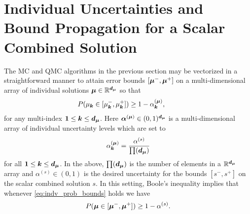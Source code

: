 \documentclass{article}[12pt]
\DeclareMathOperator{\Order}{{\mathcal O}}
\begin{document}

\section{Individual Uncertainties and Bound Propagation for a Scalar Combined Solution} \label{sec:comb_sol_approx}

The MC and QMC algorithms in the previous section may be vectorized in a straightforward manner to attain error bounds $[\boldsymbol{\mu}^-,\boldsymbol{\mu}^+]$ on a multi-dimensional array of individual solutions $\boldsymbol{\mu} \in \mathbb{R}^{\boldsymbol{d}_{\boldsymbol{\mu}}}$ so that 
\begin{equation}
    P(\mu_{\boldsymbol{k}} \in [\mu_{\boldsymbol{k}}^-,\mu_{\boldsymbol{k}}^+]) \geq 1-\alpha_{\boldsymbol{k}}^{(\boldsymbol{\mu})},  \qquad 
    \label{eq:indv_prob_bounds}
\end{equation}
for any multi-index $\boldsymbol{1} \leq \boldsymbol{k} \leq \boldsymbol{d}_{\boldsymbol{\mu}}$. Here $\boldsymbol{\alpha}^{(\boldsymbol{\mu})} \in (0,1)^{\boldsymbol{d}_{\boldsymbol{\mu}}}$ is a multi-dimensional array of individual uncertainty levels which are set to 
\begin{equation}
    \alpha_{\boldsymbol{k}}^{(\boldsymbol{\mu})} = \frac{\alpha^{(s)}}{\prod(\boldsymbol{d}_{\boldsymbol{\mu}})}
    \label{eq:alpha_mu_from_alpha_s}
\end{equation}
for all $\boldsymbol{1} \leq \boldsymbol{k} \leq \boldsymbol{d}_{\boldsymbol{\mu}}$. In the above, $\prod(\boldsymbol{d}_{\boldsymbol{\mu}})$ is the number of elements in a $\mathbb{R}^{\boldsymbol{d}_{\boldsymbol{\mu}}}$ array and $\alpha^{(s)} \in (0,1)$ is the desired uncertainty for the bounds $[s^-,s^+]$ on the scalar combined solution $s$. In this setting, Boole's inequality \cite{boole1847mathematical} implies that whenever \eqref{eq:indv_prob_bounds} holds we have
\begin{equation}
    P(\boldsymbol{\mu} \in [\boldsymbol{\mu}^-,\boldsymbol{\mu}^+]) \geq 1-\alpha^{(s)}.
    \label{eq:indv_prob_bounds_all}
\end{equation} 
\end{document}
